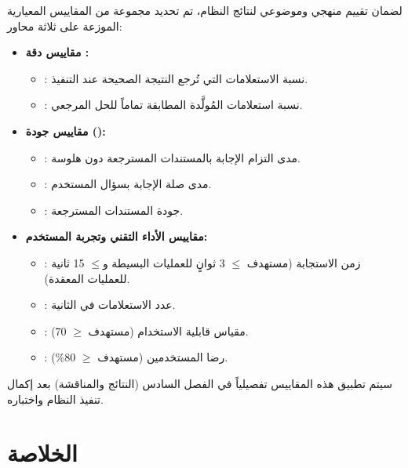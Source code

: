 لضمان تقييم منهجي وموضوعي لنتائج النظام، تم تحديد مجموعة من المقاييس
المعيارية الموزعة على ثلاثة محاور:

\begin{itemize}[label=\textcolor{kauprimary}{$\blacktriangleright$},leftmargin=*]
  \item \textbf{مقاييس دقة :}
    \begin{itemize}[label=\textcolor{kausecondary}{$\circ$},leftmargin=*]
      \item {}: نسبة الاستعلامات التي تُرجع النتيجة
            الصحيحة عند التنفيذ.
      \item {}: نسبة استعلامات  المُولَّدة المطابقة
            تماماً للحل المرجعي.
    \end{itemize}
  \item \textbf{مقاييس جودة  ():}
    \begin{itemize}[label=\textcolor{kausecondary}{$\circ$},leftmargin=*]
      \item {}: مدى التزام الإجابة بالمستندات المسترجعة دون
            هلوسة.
      \item {}: مدى صلة الإجابة بسؤال المستخدم.
      \item {}: جودة المستندات المسترجعة.
    \end{itemize}
  \item \textbf{مقاييس الأداء التقني وتجربة المستخدم:}
    \begin{itemize}[label=\textcolor{kausecondary}{$\circ$},leftmargin=*]
      \item {}: زمن الاستجابة (مستهدف $\leq$ 3 ثوانٍ للعمليات البسيطة و$\leq$ 15 ثانية للعمليات المعقدة).
      \item {}: عدد الاستعلامات في الثانية.
      \item {}: مقياس قابلية الاستخدام
            (مستهدف $\geq$ 70).
      \item {}: رضا المستخدمين (مستهدف $\geq$
            80\%).
    \end{itemize}
\end{itemize}

سيتم تطبيق هذه المقاييس تفصيلياً في الفصل السادس (النتائج والمناقشة) بعد
إكمال تنفيذ النظام واختباره.

\section{الخلاصة}
\label{sec:summary}

